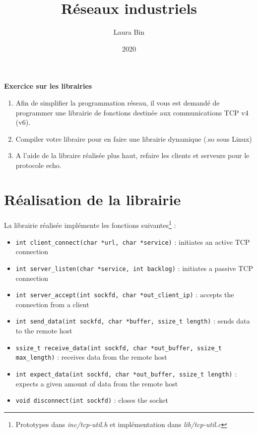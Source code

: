 \documentclass{article}
\title{Réseaux industriels}
\date{2020}
\author{Laura Bin}
\begin{document}

    \pagestyle{fancy}
    \renewcommand\headrulewidth{1pt}
    \fancyhead[R]{\today}

    \begin{center}
        \textbf{\LARGE Exercice sur les librairies}
    \end{center}
    \begin{enumerate}
        \item Afin de simplifier la programmation réseau, il vous est demandé de programmer une librairie de fonctions destinée aux communications TCP v4 (v6).
        \item Compiler votre libraire pour en faire une librairie dynamique (.so sous Linux)
        \item A l'aide de la libraire réalisée plus haut, refaire les clients et serveurs pour le protocole echo.
    \end{enumerate}

    \section{Réalisation de la librairie}
    \paragraph{}
    La librairie réalisée implémente les fonctions suivantes\footnote{Prototypes dans \emph{inc/tcp-util.h} et implémentation dans \emph{lib/tcp-util.c}} :
    \begin{itemize}
        \item \texttt{int client\_connect(char *url, char *service)} : initiates an active TCP connection
        \item \texttt{int server\_listen(char *service, int backlog)} : initiates a passive TCP connection
        \item \texttt{int server\_accept(int sockfd, char *out\_client\_ip)} : accepts the connection from a client
        \item \texttt{int send\_data(int sockfd, char *buffer, ssize\_t length)} : sends data to the remote host
        \item \texttt{ssize\_t receive\_data(int sockfd, char *out\_buffer, ssize\_t max\_length)} : receives data from the remote host
        \item \texttt{int expect\_data(int sockfd, char *out\_buffer, ssize\_t length)} : expects a given amount of data from the remote host
        \item \texttt{void disconnect(int sockfd)} : closes the socket
    \end{itemize}
\end{document}
